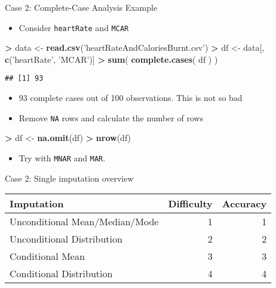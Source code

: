 \documentclass[ignorenonframetext,]{beamer}
\newenvironment{Shaded}{\begin{snugshade}}{\end{snugshade}}
\newcommand{\KeywordTok}[1]{\textcolor[rgb]{0.13,0.29,0.53}{\textbf{#1}}}
\newcommand{\StringTok}[1]{\textcolor[rgb]{0.31,0.60,0.02}{#1}}
\newcommand{\OperatorTok}[1]{\textcolor[rgb]{0.81,0.36,0.00}{\textbf{#1}}}
\newcommand{\NormalTok}[1]{#1}
\providecommand{\tightlist}{%
  \setlength{\itemsep}{0pt}\setlength{\parskip}{0pt}}
\begin{document}
\begin{frame}[fragile]{Case 2: Complete-Case Analysis Example}

\begin{itemize}[<+->]
\tightlist
\item
  Consider \texttt{heartRate} and \texttt{MCAR}
\end{itemize}

\begin{Shaded}
\begin{Highlighting}[]
\OperatorTok{>}\StringTok{ }\NormalTok{data <-}\StringTok{ }\KeywordTok{read.csv}\NormalTok{(}\StringTok{'heartRateAndCaloriesBurnt.csv'}\NormalTok{)}
\OperatorTok{>}\StringTok{ }\NormalTok{df   <-}\StringTok{ }\NormalTok{data[, }\KeywordTok{c}\NormalTok{(}\StringTok{'heartRate'}\NormalTok{, }\StringTok{'MCAR'}\NormalTok{)]}
\OperatorTok{>}\StringTok{ }\KeywordTok{sum}\NormalTok{(  }\KeywordTok{complete.cases}\NormalTok{( df ) )}
\end{Highlighting}
\end{Shaded}

\begin{verbatim}
## [1] 93
\end{verbatim}

\begin{itemize}[<+->]
\tightlist
\item
  93 complete cases out of 100 observations. This is not so bad
\item
  Remove \texttt{NA} rows and calculate the number of rows
\end{itemize}

\begin{Shaded}
\begin{Highlighting}[]
\OperatorTok{>}\StringTok{ }\NormalTok{df  <-}\StringTok{ }\KeywordTok{na.omit}\NormalTok{(df)}
\OperatorTok{>}\StringTok{ }\KeywordTok{nrow}\NormalTok{(df)}
\end{Highlighting}
\end{Shaded}

\begin{itemize}[<+->]
\tightlist
\item
  Try with \texttt{MNAR} and \texttt{MAR}.
\end{itemize}

\end{frame}

\begin{frame}{Case 2: Single imputation overview}

\begin{longtable}[]{@{}lrr@{}}
\toprule
Imputation & Difficulty & Accuracy\tabularnewline
\midrule
\endhead
Unconditional Mean/Median/Mode & 1 & 1\tabularnewline
Unconditional Distribution & 2 & 2\tabularnewline
Conditional Mean & 3 & 3\tabularnewline
Conditional Distribution & 4 & 4\tabularnewline
\bottomrule
\end{longtable}

\end{frame}
\end{document}
